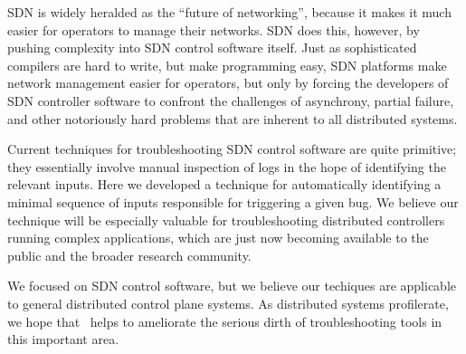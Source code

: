 
SDN is widely heralded as the ``future of networking'', because it makes it
much easier for operators to manage their networks. SDN does this, however, by
pushing complexity into SDN control software itself. Just as sophisticated
compilers are hard to write, but make programming easy, SDN platforms make
network management easier for operators, but only by forcing the developers of
SDN controller software to confront the challenges of asynchrony, partial failure, and
other notoriously hard problems that are inherent to all distributed systems.

Current techniques for troubleshooting SDN control software are quite primitive; they
essentially involve manual inspection of logs in the hope of identifying the
relevant inputs. Here we developed a technique for automatically
identifying a minimal sequence of inputs responsible for triggering a given
bug. We believe our technique will be especially valuable for troubleshooting
distributed controllers running complex applications, which are just now
becoming available to the public and the broader research community.

We focused on SDN control software, but we believe our techiques
are applicable to general distributed control plane systems. As distributed systems
profilerate, we hope that \simulator~helps to ameliorate the serious dirth of
troubleshooting tools in this important area.


